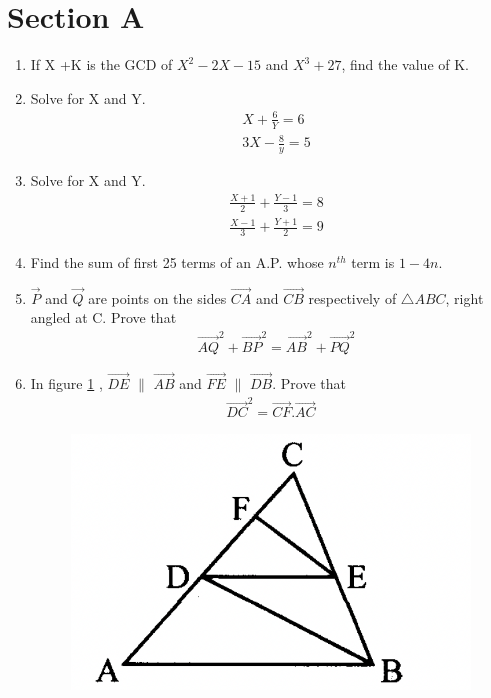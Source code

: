 \documentclass[journal,12pt,twocolumn]{IEEEtran}
\renewcommand\thesection{\arabic{section}}
\begin{document}
\section{Section A}
\renewcommand{\theequation}{\theenumi}
\begin{enumerate}[label=\thesection.\arabic*.,ref=\thesection.\theenumi]
\item If X +K is the GCD of $ X^2-2X-15 $ and $X^3+27$, find the value of K.
\item Solve for X and Y.\\ 
\begin{align}
&X+\displaystyle\frac{6}{Y}=6 \nonumber\\
&3X- \displaystyle\frac{8}{y}=5 \nonumber
 \end{align}
 
\item Solve for  X and Y.\\ 
\begin{align}
& \displaystyle\frac{X+1}{2}+\displaystyle\frac{Y-1}{3}=8 \nonumber\\
& \displaystyle\frac{X-1}{3}+\displaystyle\frac{Y+1}{2}=9 \nonumber
\end{align}
\item Find the sum of first 25 terms of an A.P. whose $n^{th} $ term is $1-4n$.
\item $\vec{P}$  and $\vec{Q}$ are points on the sides $\vec{CA}$ and $\vec{CB}$ respectively of $\triangle{ABC}$, right angled at C. Prove that
\begin{align}
&\vec{AQ}^2+ \vec{BP}^2= \vec{AB}^2+\vec{PQ}^2 \nonumber
\end{align}
\item In figure \ref{fig4} , $\vec{DE} $ $\|$ $\vec{AB} $ and $\vec{FE} $ $\|$ $\vec{DB} $. Prove that 
\begin{align}
\vec{DC}^2=\vec{CF}.\vec{AC} \nonumber
\end{align}
\begin{figure}[h!]
	\centering
    \includegraphics[width=0.5\columnwidth,center]{4.png}
    \caption{}
    \label{fig4}

\end{figure}
\end{enumerate}
\end{document}
